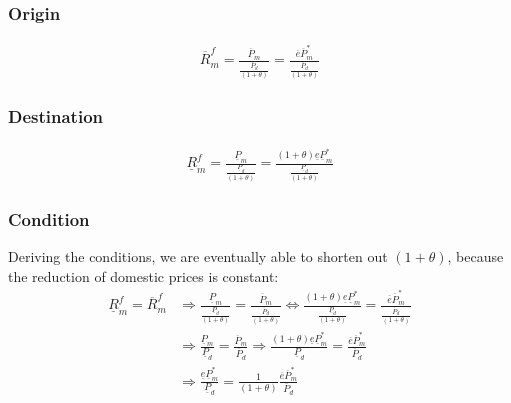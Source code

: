 \subsubsection*{Origin}
\begin{equation}\label{mpro.o}
\begin{aligned}
\overline R^f_m = \frac{\overline P_m}{\frac{\overline P_d}{ \left( 1+\theta \right) }} = \frac{\overline e \overline P^*_m}{\frac{\overline P_d}{ \left( 1+\theta \right) }}
\end{aligned} 
\end{equation}

\subsubsection*{Destination}
\begin{equation}\label{mpro.p}
\begin{aligned}
\underline R^f_m = \frac{\underline P_m}{\frac{\underline P_d}{ \left( 1+\theta \right) }} = \frac{ \left( 1+\theta \right) \underline e \underline P^*_m}{\frac{\underline P_d}{ \left( 1+\theta \right) }}
\end{aligned} 
\end{equation}
 
\subsubsection*{Condition}
Deriving the conditions, we are eventually able to shorten out $(1+\theta)$, because the reduction of domestic prices is constant: 
\begin{equation}\label{mpro.con}
\begin{aligned}
    \underline R^f_m = \overline R^f_m &\Rightarrow \frac{\underline P_m}{\frac{\underline P_d}{ \left( 1+\theta \right) }} = \frac{\overline P_m}{\frac{\overline P_d}{ \left( 1+\theta \right) }} \Leftrightarrow \frac{ \left( 1+\theta \right) \underline e \underline P^*_m}{\frac{\underline P_d}{ \left( 1+\theta \right) }} = \frac{\overline e \overline P^*_m}{\frac{\overline P_d}{ \left( 1+\theta \right) }} \\ &\Rightarrow \frac{\underline P_m}{\underline P_d} = \frac{\overline P_m}{\overline P_d} \Rightarrow \frac{ \left( 1+\theta \right) \underline e \underline P^*_m}{{\underline P_d}} = \frac{\overline e \overline P^*_m}{\overline P_d}  \\ &\Rightarrow \frac{\underline e \underline P^*_m}{{\underline P_d}} = \frac{1}{ \left( 1+\theta \right) } \frac{\overline e \overline P^*_m}{\overline P_d}
\end{aligned} 
\end{equation}


